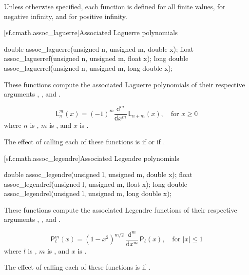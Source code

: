 \pnum
Unless otherwise specified,
each function is defined
for all finite values,
for negative infinity,
and for positive infinity.

[sf.cmath.assoc_laguerre]{Associated Laguerre polynomials}%
%
%
%
%
%
\begin{itemdecl}
double       assoc_laguerre(unsigned n, unsigned m, double x);
float        assoc_laguerref(unsigned n, unsigned m, float x);
long double  assoc_laguerrel(unsigned n, unsigned m, long double x);
\end{itemdecl}

\begin{itemdescr}
\pnum\effects
These functions compute
the associated Laguerre polynomials
of their respective arguments
, , and .

\pnum\returns
\[%
  \mathsf{L}_n^m(x) =
  (-1)^m \frac{\mathsf{d} ^ m}
	   {\mathsf{d}x ^ m} \, \mathsf{L}_{n+m}(x),
	   \quad \mbox{for $x \ge 0$}
\]
where
$n$ is ,
$m$ is , and
$x$ is .

\pnum\remark
The effect of calling each of these functions
is 
if  or if .
\end{itemdescr}

[sf.cmath.assoc_legendre]{Associated Legendre polynomials}%
%
%
%
%
%
\begin{itemdecl}
double       assoc_legendre(unsigned l, unsigned m, double x);
float        assoc_legendref(unsigned l, unsigned m, float x);
long double  assoc_legendrel(unsigned l, unsigned m, long double x);
\end{itemdecl}

\begin{itemdescr}

\pnum\effects
These functions compute
the associated Legendre functions
of their respective arguments
, , and .

\pnum\returns
\[%
  \mathsf{P}_\ell^m(x) =
  (1 - x^2) ^ {m/2}
  \:
  \frac{ \mathsf{d} ^ m}
       { \mathsf{d}x ^ m} \, \mathsf{P}_\ell(x),
	   \quad \mbox{for $|x| \le 1$}
\]
where
$l$ is ,
$m$ is , and
$x$ is .

\pnum\remark
The effect of calling each of these functions
is 
if .
\end{itemdescr}

